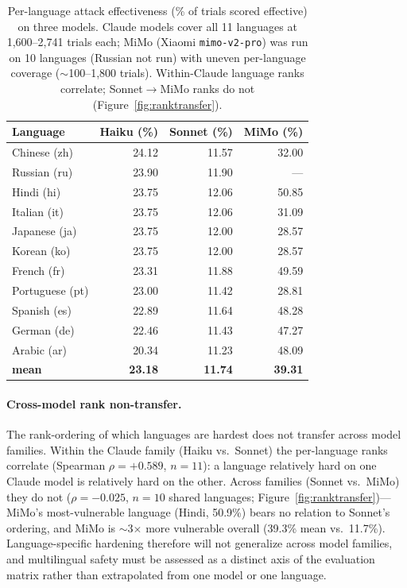 \documentclass{article}
\begin{document}
\begin{table}[t]
\centering
\small
\caption{Per-language attack effectiveness (\% of trials scored effective) on three models. Claude models cover all 11 languages at 1{,}600--2{,}741 trials each; MiMo (Xiaomi \texttt{mimo-v2-pro}) was run on 10 languages (Russian not run) with uneven per-language coverage ($\sim$100--1{,}800 trials). Within-Claude language ranks correlate; Sonnet$\to$MiMo ranks do not (Figure~\ref{fig:ranktransfer}).}
\label{tab:multilingual}
\begin{tabular}{lrrr}
\toprule
\textbf{Language} & \textbf{Haiku (\%)} & \textbf{Sonnet (\%)} & \textbf{MiMo (\%)} \\
\midrule
Chinese (zh) & 24.12 & 11.57 & 32.00 \\
Russian (ru) & 23.90 & 11.90 & --- \\
Hindi (hi) & 23.75 & 12.06 & 50.85 \\
Italian (it) & 23.75 & 12.06 & 31.09 \\
Japanese (ja) & 23.75 & 12.00 & 28.57 \\
Korean (ko) & 23.75 & 12.00 & 28.57 \\
French (fr) & 23.31 & 11.88 & 49.59 \\
Portuguese (pt) & 23.00 & 11.42 & 28.81 \\
Spanish (es) & 22.89 & 11.64 & 48.28 \\
German (de) & 22.46 & 11.43 & 47.27 \\
Arabic (ar) & 20.34 & 11.23 & 48.09 \\
\midrule
\textbf{mean} & \textbf{23.18} & \textbf{11.74} & \textbf{39.31} \\
\bottomrule
\end{tabular}
\end{table}

\paragraph{Cross-model rank non-transfer.}
The rank-ordering of which languages are hardest does not transfer across model families. Within the Claude family (Haiku vs.\ Sonnet) the per-language ranks correlate (Spearman $\rho=+0.589$, $n=11$): a language relatively hard on one Claude model is relatively hard on the other. Across families (Sonnet vs.\ MiMo) they do not ($\rho=-0.025$, $n=10$ shared languages; Figure~\ref{fig:ranktransfer})---MiMo's most-vulnerable language (Hindi, 50.9\%) bears no relation to Sonnet's ordering, and MiMo is $\sim$3$\times$ more vulnerable overall (39.3\% mean vs.\ 11.7\%). Language-specific hardening therefore will not generalize across model families, and multilingual safety must be assessed as a distinct axis of the evaluation matrix rather than extrapolated from one model or one language.
\end{document}
